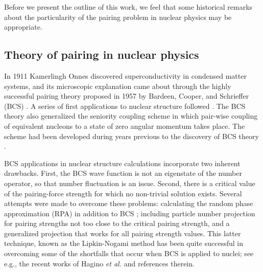 \documentclass[preprint,rmp,aps,floatfix]{revtex4}
\begin{document}
Before we present the outline of this work, we feel that
some historical remarks about the particularity of the pairing 
problem in nuclear physics may be appropriate.

\subsection{Theory of pairing in nuclear physics}

In 1911 Kamerlingh Onnes discovered superconductivity in
condensed matter systems, and its microscopic explanation came 
about through the highly successful pairing theory proposed 
in 1957 by Bardeen, Cooper, and Schrieffer (BCS) 
\cite{bcs_theory}. A series of first applications to nuclear
structure followed \cite{bmp_58,belyaev_59,migdal_59}. 
The BCS theory also generalized
the seniority coupling scheme in which pair-wise coupling of 
equivalent nucleons to a state of zero angular momentum 
takes place. The scheme had been developed during
years previous to the discovery of BCS theory 
\cite{racah_42,mayer_50,racah_53}. 

BCS applications in nuclear structure calculations 
incorporate two inherent drawbacks. First, the BCS
wave function is not an eigenstate of the number operator, so that number
fluctuation is an issue. Second, there is a critical value
of the pairing-force strength for which no non-trivial solution exists. 
Several attempts were made to overcome these problems:
calculating the random phase approximation (RPA) in addition 
to BCS \cite{uw}; including particle number projection \cite{klm}
for pairing strengths not too close to the critical pairing strength, 
and a generalized projection that works for all pairing strength 
values. This latter technique, known as the Lipkin-Nogami method 
\cite{lipkin,nogami} has been quite successful in overcoming 
some of the shortfalls that
occur when BCS is applied to nuclei; see e.g., the recent works of Hagino 
{\em et al.}  \cite{hagino2000,hagino2002} and references therein. 
\end{document}
